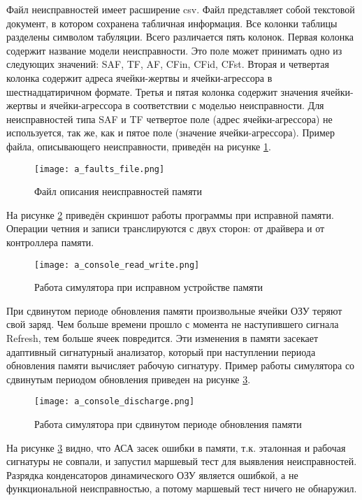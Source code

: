 Файл неисправностей имеет расширение csv. Файл представляет собой текстовой документ, в котором сохранена табличная информация. Все колонки таблицы разделены символом табуляции. Всего различается пять колонок. Первая колонка содержит название модели неисправности. Это поле может принимать одно из следующих значений: SAF, TF, AF, CFin, CFid, CFst. Вторая и четвертая колонка содержит адреса ячейки-жертвы и ячейки-агрессора в шестнадцатиричном формате. Третья и пятая колонка содержит значения ячейки-жертвы и ячейки-агрессора в соответствии с моделью неисправности. Для неисправностей типа SAF и TF четвертое поле (адрес ячейки-агрессора) не используется, так же, как и пятое поле (значение ячейки-агрессора). Пример файла, описывающего неисправности, приведён на рисунке \ref{fig:usage:faults_file}.

\begin{figure}[ht]
\centering
  \texttt{[image: a\_faults\_file.png]}  
  \caption{Файл описания неисправностей памяти}
  \label{fig:usage:faults_file}
\end{figure}

На рисунке \ref{fig:usage:console_read_write} приведён скриншот работы программы при исправной памяти. Операции четния и записи транслируются с двух сторон: от драйвера и от контроллера памяти.

\begin{figure}[ht]
\centering
  \texttt{[image: a\_console\_read\_write.png]}  
  \caption{Работа симулятора при исправном устройстве памяти}
  \label{fig:usage:console_read_write}
\end{figure}

При сдвинутом периоде обновления памяти произвольные ячейки ОЗУ теряют свой заряд. Чем больше времени прошло с момента не наступившего сигнала Refresh, тем больше ячеек повредится. Эти изменения в памяти засекает адаптивный сигнатурный анализатор, который при наступлении периода обновления памяти вычисляет рабочую сигнатуру. Пример работы симулятора со сдвинутым периодом обновления приведен на рисунке \ref{fig:usage:console_discharge}.

\begin{figure}[ht]
\centering
  \texttt{[image: a\_console\_discharge.png]}  
  \caption{Работа симулятора при сдвинутом периоде обновления памяти}
  \label{fig:usage:console_discharge}
\end{figure}

На рисунке \ref{fig:usage:console_discharge} видно, что АСА засек ошибки в памяти, т.к. эталонная и рабочая сигнатуры не совпали, и запустил маршевый тест для выявления неисправностей. Разрядка конденсаторов динамического ОЗУ является ошибкой, а не функциональной неисправностью, а потому маршевый тест ничего не обнаружил. 

